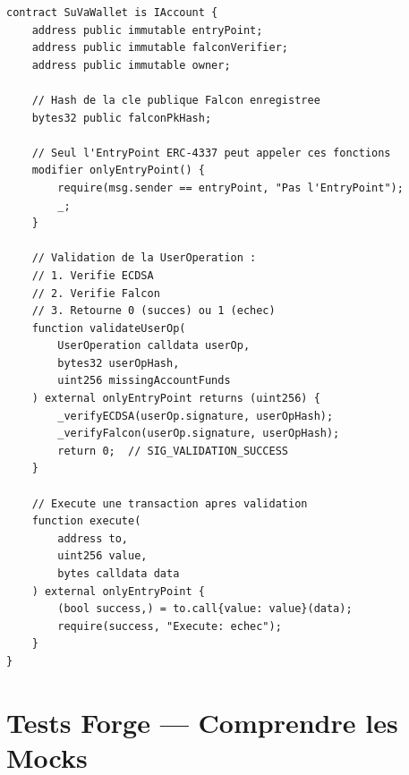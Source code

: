\documentclass[11pt,a4paper]{article}
\begin{document}
\begin{lstlisting}[style=solidity, caption={SuVaWallet.sol --- structure annotée}]
contract SuVaWallet is IAccount {
    address public immutable entryPoint;
    address public immutable falconVerifier;
    address public immutable owner;

    // Hash de la cle publique Falcon enregistree
    bytes32 public falconPkHash;

    // Seul l'EntryPoint ERC-4337 peut appeler ces fonctions
    modifier onlyEntryPoint() {
        require(msg.sender == entryPoint, "Pas l'EntryPoint");
        _;
    }

    // Validation de la UserOperation :
    // 1. Verifie ECDSA
    // 2. Verifie Falcon
    // 3. Retourne 0 (succes) ou 1 (echec)
    function validateUserOp(
        UserOperation calldata userOp,
        bytes32 userOpHash,
        uint256 missingAccountFunds
    ) external onlyEntryPoint returns (uint256) {
        _verifyECDSA(userOp.signature, userOpHash);
        _verifyFalcon(userOp.signature, userOpHash);
        return 0;  // SIG_VALIDATION_SUCCESS
    }

    // Execute une transaction apres validation
    function execute(
        address to,
        uint256 value,
        bytes calldata data
    ) external onlyEntryPoint {
        (bool success,) = to.call{value: value}(data);
        require(success, "Execute: echec");
    }
}
\end{lstlisting}

\section{Tests Forge --- Comprendre les Mocks}
\end{document}
